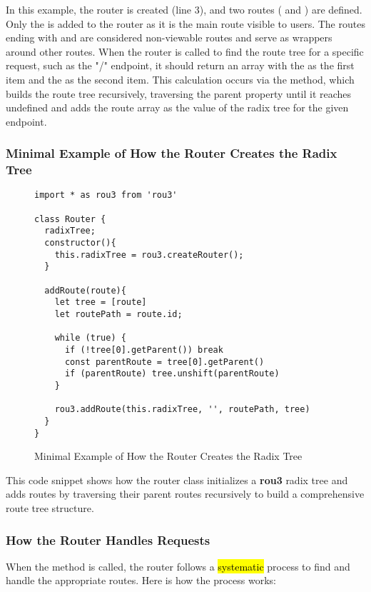 In this example, the router is created (line 3), and two routes ( and ) are defined. Only the  is added to the router as it is the main route visible to users. The routes ending with  and  are considered non-viewable routes and serve as wrappers around other routes. When the router is called to find the route tree for a specific request, such as the "/" endpoint, it should return an array with the  as the first item and the  as the second item. This calculation occurs via the  method, which builds the route tree recursively, traversing the parent property until it reaches undefined and adds the route array as the value of the radix tree for the given endpoint.

\pagebreak

\subsubsection*{Minimal Example of How the Router Creates the Radix Tree}
\begin{figure}[h!]
\begin{verbatim}
import * as rou3 from 'rou3'

class Router {
  radixTree;
  constructor(){
    this.radixTree = rou3.createRouter();
  }

  addRoute(route){
    let tree = [route]
    let routePath = route.id;

    while (true) {
      if (!tree[0].getParent()) break
      const parentRoute = tree[0].getParent()
      if (parentRoute) tree.unshift(parentRoute)
    }

    rou3.addRoute(this.radixTree, '', routePath, tree)
  }
}
\end{verbatim}
\caption{Minimal Example of How the Router Creates the Radix Tree}
\end{figure}

This code snippet shows how the router class initializes a \textbf{rou3} radix tree and adds routes by traversing their parent routes recursively to build a comprehensive route tree structure.





\subsubsection{How the Router Handles Requests}

When the  method is called, the router follows a \hl{systematic} process to find and handle the appropriate routes. Here is how the process works:

